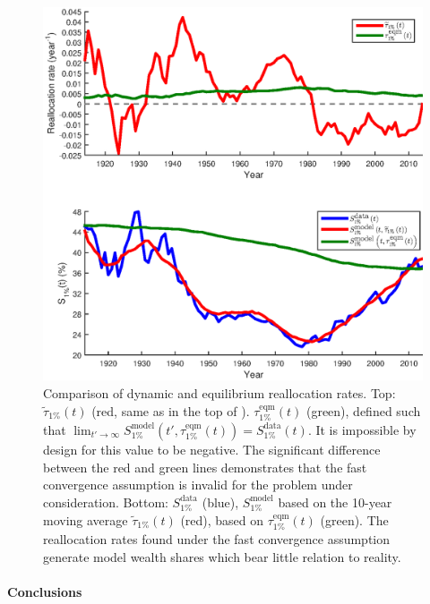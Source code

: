 \begin{figure}[!htb]
\centering
\includegraphics[width=1.0\textwidth] {./chapter_3/figs/tau_eqm_top1.eps}
\caption{Comparison of dynamic and equilibrium reallocation rates. Top: $\widetilde{\tau}_{1\%}\left(t\right)$ (red, same as in the top of ). $\tau^\text{eqm}_{1\%}\left(t\right)$ (green), defined such that $\lim_{t'\to\infty} S^{\text{model}}_{1\%}\left(t',\tau^\text{eqm}_{1\%}\left(t\right)\right)=S^{\text{data}}_{1\%}\left(t\right)$. It is impossible by design for this value to be negative. The significant difference between the red and green lines demonstrates that the fast convergence assumption is invalid for the problem under consideration. Bottom: $S^{\text{data}}_{1\%}$ (blue), $S^{\text{model}}_{1\%}$ based on the 10-year moving average $\widetilde{\tau}_{1\%}\left(t\right)$ (red), based on $\tau^\text{eqm}_{1\%}\left(t\right)$ (green). The reallocation rates found under the fast convergence assumption generate model wealth shares which bear little relation to reality.}
\end{figure}

\paragraph{Conclusions}

